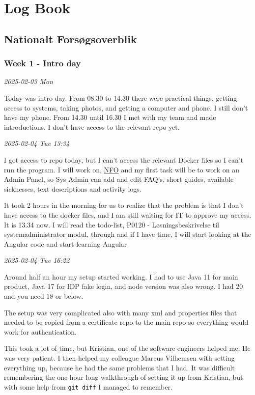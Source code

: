 \documentclass[../main.tex]{subfiles}
\begin{document}
\section{Log Book}
\subsection{Nationalt Forsøgsoverblik}
\subsubsection{Week 1 - Intro day}

\noindent \textit{2025-02-03 Mon}
\smallskip

Today was intro day. From 08.30 to 14.30 there were practical things, getting access to systems, taking photos, and getting a computer and phone. I still don't have my phone. From 14.30 until 16.30 I met with my team and made introductions. I don't have access to the relevant repo yet.

\bigskip
\noindent \textit{2025-02-04 Tue 13:34}
\smallskip

I got access to repo today, but I can't access the relevant Docker files so I can't run the program. I will work on, \href{https://nationaltforsoegsoverblik.dk/}{NFO} and my first task will be to work on an Admin Panel, so Sys Admin can add and edit FAQ's, short guides, available sicknesses, text descriptions and activity logs.

It took 2 hours in the morning for us to realize that the problem is that I don't have access to the docker files, and I am still waiting for IT to approve my access. It is 13.34 now. I will read the todo-list, P0120 - Løsningsbeskrivelse til systemadministrator modul, through and if I have time, I will start looking at the Angular code and start learning Angular

\bigskip
\noindent \textit{2025-02-04 Tue 16:22}
\smallskip

Around half an hour my setup started working. I had to use Java 11 for main product, Java 17 for IDP fake login, and node version was also wrong. I had 20 and you need 18 or below.

The setup was very complicated also with many xml and properties files that needed to be copied from a certificate repo to the main repo so everything would work for authentication.

This took a lot of time, but Kristian, one of the software engineers helped me. He was very patient. I then helped my colleague Marcus Vilhemsen with setting everything up, because he had the same problems that I had. It was difficult remembering the one-hour long walkthrough of setting it up from Kristian, but with some help from \verb|git diff| I managed to remember.
\end{document}
